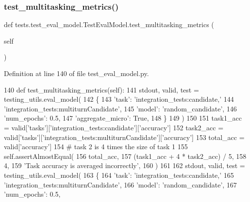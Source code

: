 \subsubsection{\texorpdfstring{test\+\_\+multitasking\+\_\+metrics()}{test\_multitasking\_metrics()}}
{\footnotesize\ttfamily def tests.\+test\+\_\+eval\+\_\+model.\+Test\+Eval\+Model.\+test\+\_\+multitasking\+\_\+metrics (\begin{DoxyParamCaption}\item[{}]{self }\end{DoxyParamCaption})}



Definition at line 140 of file test\+\_\+eval\+\_\+model.\+py.


\begin{DoxyCode}
140     \textcolor{keyword}{def }test\_multitasking\_metrics(self):
141         stdout, valid, test = testing\_utils.eval\_model(
142             \{
143                 \textcolor{stringliteral}{'task'}: \textcolor{stringliteral}{'integration\_tests:candidate,'}
144                 \textcolor{stringliteral}{'integration\_tests:multiturnCandidate'},
145                 \textcolor{stringliteral}{'model'}: \textcolor{stringliteral}{'random\_candidate'},
146                 \textcolor{stringliteral}{'num\_epochs'}: 0.5,
147                 \textcolor{stringliteral}{'aggregate\_micro'}: \textcolor{keyword}{True},
148             \}
149         )
150 
151         task1\_acc = valid[\textcolor{stringliteral}{'tasks'}][\textcolor{stringliteral}{'integration\_tests:candidate'}][\textcolor{stringliteral}{'accuracy'}]
152         task2\_acc = valid[\textcolor{stringliteral}{'tasks'}][\textcolor{stringliteral}{'integration\_tests:multiturnCandidate'}][\textcolor{stringliteral}{'accuracy'}]
153         total\_acc = valid[\textcolor{stringliteral}{'accuracy'}]
154         \textcolor{comment}{# task 2 is 4 times the size of task 1}
155         self.assertAlmostEqual(
156             total\_acc,
157             (task1\_acc + 4 * task2\_acc) / 5,
158             4,
159             \textcolor{stringliteral}{'Task accuracy is averaged incorrectly'},
160         )
161 
162         stdout, valid, test = testing\_utils.eval\_model(
163             \{
164                 \textcolor{stringliteral}{'task'}: \textcolor{stringliteral}{'integration\_tests:candidate,'}
165                 \textcolor{stringliteral}{'integration\_tests:multiturnCandidate'},
166                 \textcolor{stringliteral}{'model'}: \textcolor{stringliteral}{'random\_candidate'},
167                 \textcolor{stringliteral}{'num\_epochs'}: 0.5,

\end{DoxyCode}
